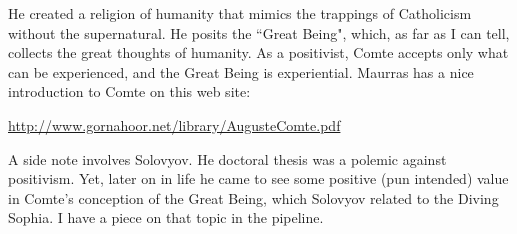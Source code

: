 \begin{footnotesize}
\begin{sffamily}
He created a religion of humanity that mimics the trappings of Catholicism without the supernatural. He posits the ``Great Being", which, as far as I can tell, collects the great thoughts of humanity. As a positivist, Comte accepts only what can be experienced, and the Great Being is experiential. Maurras has a nice introduction to Comte on this web site:

\url{http://www.gornahoor.net/library/AugusteComte.pdf}

A side note involves Solovyov. He doctoral thesis was a polemic against positivism. Yet, later on in life he came to see some positive (pun intended) value in Comte's conception of the Great Being, which Solovyov related to the Diving Sophia. I have a piece on that topic in the pipeline.


\end{sffamily}\end{footnotesize}
